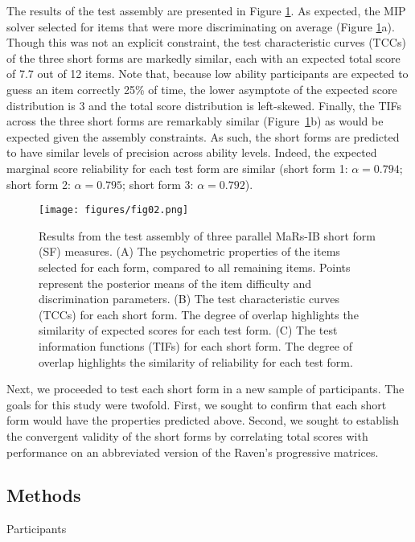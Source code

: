 \documentclass[a4paper,man,natbib]{apa6}
\makeatletter
\renewcommand{\subsubsection}{\@startsection{subsubsection}{3}
  {\z@}%
  {\b@level@two@skip}{\e@level@two@skip}%
  {\normalfont\normalsize\bfseries}}
\makeatother
\begin{document}
The results of the test assembly are presented in Figure \ref{fig:fig02}. As expected, the MIP solver selected for items that were more discriminating on average (Figure \ref{fig:fig02}a). Though this was not an explicit constraint, the test characteristic curves (TCCs) of the three short forms are markedly similar, each with an expected total score of 7.7 out of 12 items. Note that, because low ability participants are expected to guess an item correctly 25\% of time, the lower asymptote of the expected score distribution is 3 and the total score distribution is left-skewed. Finally, the TIFs across the three short forms are remarkably similar (Figure~\ref{fig:fig02}b) as would be expected given the assembly constraints. As such, the short forms are predicted to have similar levels of precision across ability levels. Indeed, the expected marginal score reliability for each test form are similar (short form 1: $\alpha = 0.794$; short form 2: $\alpha = 0.795$; short form 3: $\alpha = 0.792$). 

\begin{figure}
\centering
\texttt{[image: figures/fig02.png]}
\caption{\label{fig:fig02}Results from the test assembly of three parallel MaRs-IB short form (SF) measures. (A) The psychometric properties of the items selected for each form, compared to all remaining items. Points represent the posterior means of the item difficulty and discrimination  parameters. (B) The test characteristic curves (TCCs) for each short form. The degree of overlap highlights the similarity of expected scores for each test form. (C) The test information functions (TIFs) for each short form. The degree of overlap highlights the similarity of reliability for each test form.}
\end{figure}

Next, we proceeded to test each short form in a new sample of participants. The goals for this study were twofold. First, we sought to confirm that each short form would have the properties predicted above. Second, we sought to establish the convergent validity of the short forms by correlating total scores with performance on an abbreviated version of the Raven's progressive matrices.

\subsection{Methods}

\subsubsection{Participants}
\end{document}
